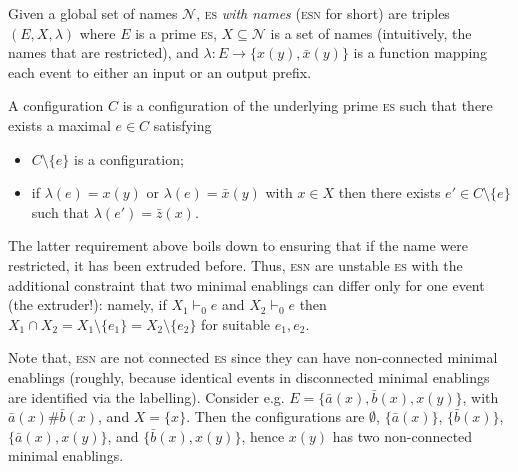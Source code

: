 \documentclass[conference]{IEEEtran}
\newcommand{\esabbr}{\textsc{es}}
\newcommand{\esnmabbr}{\textsc{esn}}
\begin{document}
Given a global set of names $\mathcal{N}$, {\esabbr} \emph{with names}
({\esnmabbr} for short) are triples $(E, X, \lambda)$ where $E$ is a
prime {\esabbr}, $X \subseteq \mathcal{N}$ is a set of names
(intuitively, the names that are restricted), and
$\lambda : E \to \{ x(y), \bar{x}(y) \}$ is a function mapping each event
to either an input or an output prefix.

A configuration $C$ is a configuration of the underlying prime
{\esabbr} such that there exists a maximal $e \in C$
satisfying
\begin{itemize}
\item $C \setminus \{ e \}$ is a configuration;
\item if $\lambda(e) = x(y)$ or $\lambda(e) = \bar{x}(y)$ with
  $x \in X$ then there exists $e' \in C \setminus \{e\}$ such that
  $\lambda(e') = \bar{z}(x)$.
\end{itemize}

The latter requirement above boils down to ensuring that if the name were 
restricted, it has been extruded before.
% 
Thus, {\esnmabbr} are unstable {\esabbr} with the additional constraint 
that two minimal enablings can differ only for one event (the extruder!):
namely, if $X_1 \vdash_0 e$ and $X_2 \vdash_0 e$ then
$X_1 \cap X_2 = X_1 \setminus \{ e_1 \} = X_2 \setminus \{ e_2 \}$
for suitable $e_1, e_2$.

Note that, {\esnmabbr} are not connected {\esabbr} since they can have 
non-connected minimal enablings (roughly, because identical events in 
disconnected minimal enablings are identified via the labelling).
% 
Consider e.g. $E = \{ \bar{a}(x), \bar{b}(x), x(y) \}$, with
$\bar{a}(x) \# \bar{b}(x)$, and $X=\{x\}$. Then the
configurations are $\emptyset$, $\{\bar{a}(x)\}$, $\{\bar{b}(x)\}$,
$\{\bar{a}(x), x(y)\}$, and $\{\bar{b}(x), x(y)\}$, hence $x(y)$ has two
non-connected minimal enablings. 
% 
\end{document}
